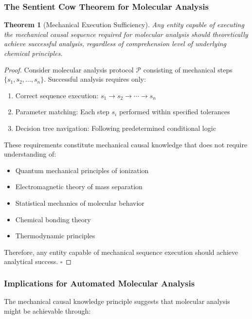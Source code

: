 \documentclass[11pt,a4paper]{article}
\newtheorem{theorem}{Theorem}[section]
\theoremstyle{remark}
\begin{document}
\subsubsection{The Sentient Cow Theorem for Molecular Analysis}

\begin{theorem}[Mechanical Execution Sufficiency]
Any entity capable of executing the mechanical causal sequence required for molecular analysis should theoretically achieve successful analysis, regardless of comprehension level of underlying chemical principles.
\end{theorem}

\begin{proof}
Consider molecular analysis protocol $\mathcal{P}$ consisting of mechanical steps $\{s_1, s_2, \ldots, s_n\}$. Successful analysis requires only:
\begin{enumerate}
\item Correct sequence execution: $s_1 \rightarrow s_2 \rightarrow \cdots \rightarrow s_n$
\item Parameter matching: Each step $s_i$ performed within specified tolerances
\item Decision tree navigation: Following predetermined conditional logic
\end{enumerate}

These requirements constitute mechanical causal knowledge that does not require understanding of:
\begin{itemize}
\item Quantum mechanical principles of ionization
\item Electromagnetic theory of mass separation  
\item Statistical mechanics of molecular behavior
\item Chemical bonding theory
\item Thermodynamic principles
\end{itemize}

Therefore, any entity capable of mechanical sequence execution should achieve analytical success. $\square$
\end{proof}

\subsubsection{Implications for Automated Molecular Analysis}

The mechanical causal knowledge principle suggests that molecular analysis might be achievable through:
\end{document}
